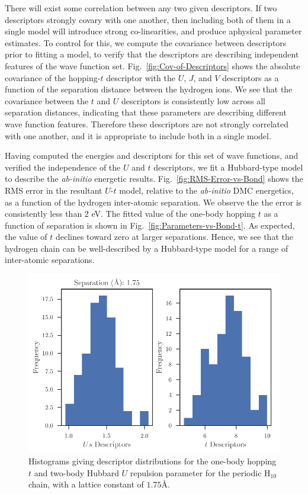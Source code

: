 \documentclass[prl,12pt,onecolumn,nofootinbib,notitlepage,english,superscriptaddress]{revtex4-1}
\begin{document}
There will exist some correlation between any two given descriptors. If two descriptors strongly covary with one another, then including both of them in a single model will introduce strong co-linearities, and produce aphysical parameter estimates. To control for this, we compute the covariance between descriptors prior to fitting a model, to verify that the descriptors are describing independent features of the wave function set. Fig.~\ref{fig:Cov-of-Descriptors} shows the absolute covariance of the hopping-$t$ descriptor with the $U$, $J$, and $V$ descriptors as a function of the separation distance between the hydrogen ions. We see that the covariance between the $t$ and $U$ descriptors is consistently low across all separation distances, indicating that these parameters are describing different wave function features. Therefore these descriptors are not strongly correlated with one another, and it is appropriate to include both in a single model.

Having computed the energies and descriptors for this set of wave functions, and verified the independence of the $U$ and $t$ descriptors, we fit a Hubbard-type model to describe the \textit{ab-initio} energetic results. Fig.~\ref{fig:RMS-Error-vs-Bond} shows the RMS error in the resultant $U$-$t$ model, relative to the \textit{ab-initio} DMC energetics, as a function of the hydrogen inter-atomic separation. We observe the the error is consistently less than 2 eV. The fitted value of the one-body hopping $t$ as a function of separation is shown in Fig.~\ref{fig:Parameters-vs-Bond-t}. As expected, the value of $t$ declines toward zero at larger separations. Hence, we see that the hydrogen chain can be well-described by a Hubbard-type model for a range of inter-atomic separations.

\begin{figure}
\centering
\includegraphics[scale=0.7]{Spin0_pbe_H_relation.pdf}
\caption{Histograms giving descriptor distributions for the one-body hopping $t$ and two-body Hubbard $U$ repulsion parameter for the periodic H$_{10}$ chain, with a lattice constant of $1.75$\AA.}\label{fig:Histogram-of-Parameter-Values}
 \end{figure}
 
\end{document}
